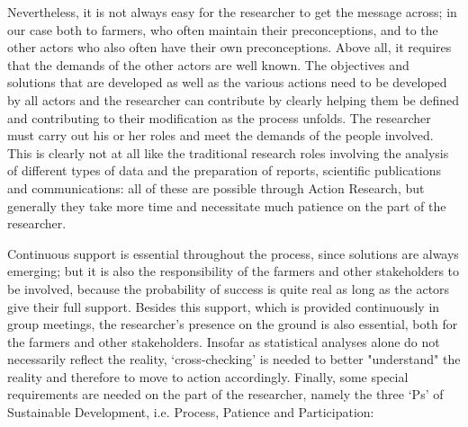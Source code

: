 \documentclass[10pt,a4paper]{article}
\begin{document}
\begin{multicols}{2}
Nevertheless, it is not always easy for the researcher to get the message across; in our case both to farmers, who often maintain their preconceptions, and to the other actors who also often have their own preconceptions. Above all, it requires that the demands of the other actors are well known. The objectives and solutions that are developed as well as the various actions need to be developed by all actors and the researcher can contribute by clearly helping them be defined and contributing to their modification as the process unfolds. The researcher must carry out his or her roles and meet the demands of the people involved. This is clearly not at all like the traditional research roles involving the analysis of different types of data and the preparation of reports, scientific publications and communications: all of these are possible through Action Research, but generally they take more time and necessitate much patience on the part of the researcher.

Continuous support is essential throughout the process, since solutions are always emerging; but it is also the responsibility of the farmers and other stakeholders to be involved, because the probability of success is quite real as long as the actors give their full support. Besides this support, which is provided continuously in group meetings, the researcher's presence on the ground is also essential, both for the farmers and other stakeholders. Insofar as statistical analyses alone do not necessarily reflect the reality, `cross-checking' is needed to better "understand" the reality and therefore to move to action accordingly. Finally, some special requirements are needed on the part of the researcher, namely the three `Ps' of Sustainable Development, i.e. Process, Patience and Participation:


\end{multicols}
\end{document}

